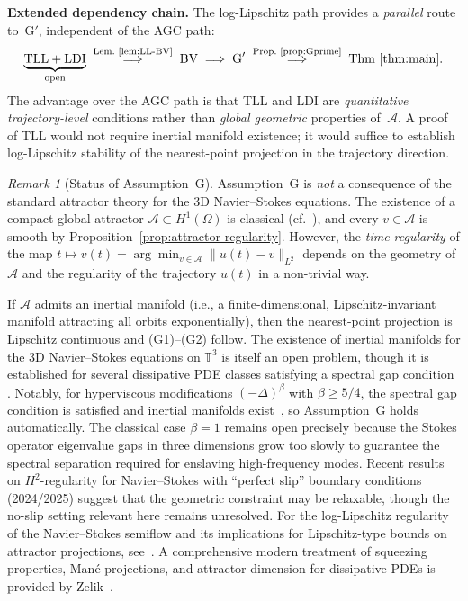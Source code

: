 \documentclass[12pt,a4paper]{article}
\theoremstyle{definition}
\theoremstyle{plain}
\theoremstyle{remark}
\newtheorem{remark}[definition]{Remark}
\begin{document}
\medskip\noindent
\textbf{Extended dependency chain.}\;
The log-Lipschitz path provides a \emph{parallel} route to~G$'$,
independent of the AGC path:
\[
  \underbrace{\textup{TLL} + \textup{LDI}}_{\text{open}}
  \;\overset{\text{Lem.~\ref{lem:LL-BV}}}{\Longrightarrow}\;
  \textup{BV}
  \;\Longrightarrow\;
  \textup{G}'
  \;\overset{\text{Prop.~\ref{prop:Gprime}}}{\Longrightarrow}\;
  \textup{Thm~\ref{thm:main}}.
\]
The advantage over the AGC path is that TLL and LDI are
\emph{quantitative trajectory-level} conditions rather than
\emph{global geometric} properties of~$\mathcal{A}$.
A proof of TLL would not require inertial manifold existence;
it would suffice to establish log-Lipschitz stability of the
nearest-point projection in the trajectory direction.

\bigskip

\begin{remark}[Status of Assumption~G]\label{rem:assumption-G}
Assumption~G is \emph{not} a consequence of the standard attractor theory for the
3D Navier--Stokes equations.  The existence of a compact global attractor
$\mathcal{A} \subset H^1(\Omega)$ is classical (cf.\
\cite{FoiasManleyRosaTemam2001,Temam2001}), and every $v \in \mathcal{A}$ is smooth
by Proposition~\ref{prop:attractor-regularity}.  However, the \emph{time regularity}
of the map $t \mapsto v(t) = \arg\min_{v \in \mathcal{A}} \|u(t) - v\|_{L^2}$
depends on the geometry of $\mathcal{A}$ and the regularity of the trajectory $u(t)$
in a non-trivial way.

If $\mathcal{A}$ admits an inertial manifold (i.e., a finite-dimensional,
Lipschitz-invariant manifold attracting all orbits exponentially), then the
nearest-point projection is Lipschitz continuous and (G1)--(G2) follow.
The existence of inertial manifolds for the 3D Navier--Stokes equations on
$\mathbb{T}^3$ is itself an open problem, though it is established for several
dissipative PDE classes satisfying a spectral gap condition
\cite{EdenFoiasNicolaenko1994}. Notably, for hyperviscous
modifications $(-\Delta)^{\beta}$ with $\beta \geq 5/4$, the spectral gap
condition is satisfied and inertial manifolds exist~\cite{MalletParetSell1988},
so Assumption~G holds automatically. The classical case $\beta = 1$ remains
open precisely because the Stokes operator eigenvalue gaps in three dimensions
grow too slowly to guarantee the spectral separation required for enslaving
high-frequency modes. Recent results on $H^2$-regularity for Navier--Stokes
with ``perfect slip'' boundary conditions (2024/2025) suggest that the
geometric constraint may be relaxable, though the no-slip setting relevant
here remains unresolved.
For the log-Lipschitz regularity of the Navier--Stokes semiflow and its
implications for Lipschitz-type bounds on attractor projections,
see~\cite{BarbuCannone2016,MalletParetSell1988}.
A comprehensive modern treatment of squeezing properties, Man\'e projections,
and attractor dimension for dissipative PDEs is provided
by Zelik~\cite{Zelik2022}.


\end{remark}
\end{document}
